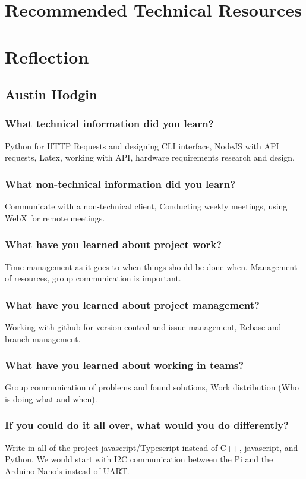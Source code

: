 \documentclass[onecolumn, draftclsnofoot,10pt, compsoc]{IEEEtran}
\begin{document}
	\section{Recommended Technical Resources}
	
	\section{Reflection}
		\subsection{Austin Hodgin}
			\subsubsection{What technical information did you learn?}
			Python for HTTP Requests and designing CLI interface, NodeJS with API requests, Latex, working with API, hardware requirements research and design. 
			\subsubsection{What non-technical information did you learn?}
			Communicate with a non-technical client, Conducting weekly meetings, using WebX for remote meetings. 
			\subsubsection{What have you learned about project work?}
			Time management as it goes to when things should be done when. Management of resources, group communication is important.
			\subsubsection{What have you learned about project management?}
			Working with github for version control and issue management, Rebase and branch management.
			\subsubsection{What have you learned about working in teams?}
			Group communication of problems and found solutions, Work distribution (Who is doing what and when).  
			\subsubsection{If you could do it all over, what would you do differently?}
			Write in all of the project  javascript/Typescript instead of C++, javascript, and Python. We would start with I2C communication between the Pi and the  Arduino Nano's instead of UART. 
\end{document}
